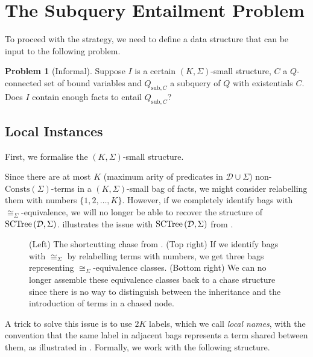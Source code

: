 \documentclass[12pt]{report}
\theoremstyle{plain}
\theoremstyle{definition}
\newtheorem{problem}[theorem]{Problem}
\def\Consts{{\mathrm{Consts}}}
\newcommand{\SCTree}[2]{\ensuremath{\normalfont{\textrm{SCTree}} \left( #1, #2 \right)}}
\begin{document}
\section{The Subquery Entailment Problem}
\label{subquery-entailment-problem-section}

To proceed with the strategy, we need to define a data structure that can be input to the following problem.

\begin{problem}[Informal]
\label{informal-subquery-entailment-problem}
  Suppose $I$ is a certain $(K, \Sigma)$-small structure, $C$ a $Q$-connected set of bound variables and $Q_{\mathrm{sub}, C}$ a subquery of $Q$ with existentials $C$. Does $I$ contain enough facts to entail $Q_{\mathrm{sub}, C}$?
\end{problem}

\subsection{Local Instances}
\label{subsection:local-instances}

First, we formalise the $(K, \Sigma)$-small structure.

Since there are at most $K$ (maximum arity of predicates in $\mathcal{D} \cup \Sigma$) non-$\Consts(\Sigma)$-terms in a $(K, \Sigma)$-small bag of facts, we might consider relabelling them with numbers $\{ 1, 2, \ldots, K \}$. However, if we completely identify bags with $\cong_\Sigma$-equivalence, we will no longer be able to recover the structure of $\SCTree{\mathcal{D}}{\Sigma}$.  illustrates the issue with $\SCTree{\mathcal{D}}{\Sigma}$ from .

\begin{figure}[ht]
  \centering
  
  \caption{(Left) The shortcutting chase from . (Top right) If we identify bags with $\cong_\Sigma$ by relabelling terms with numbers, we get three bags representing $\cong_\Sigma$-equivalence classes. (Bottom right) We can no longer assemble these equivalence classes back to a chase structure since there is no way to distinguish between the inheritance and the introduction of terms in a chased node.}
  \label{sctree-simple-example-equivalence-classes}
\end{figure}

A trick to solve this issue is to use $2K$ labels, which we call \emph{local names}, with the convention that the same label in adjacent bags represents a term shared between them, as illustrated in . Formally, we work with the following structure.
\end{document}
